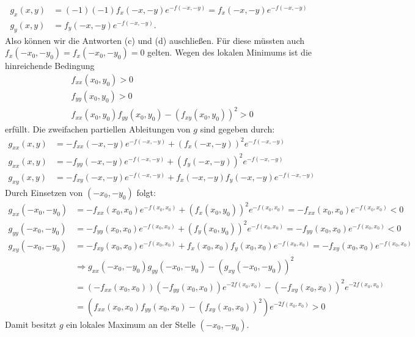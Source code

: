 \begin{align*}
	g_x(x,y) &= (-1) (-1) f_x(-x,-y) e^{-f(-x,-y)}
	=
	f_x(-x,-y) e^{-f(-x,-y)}\\
	g_y(x,y) &=
	f_y(-x,-y) e^{-f(-x,-y)}.
\end{align*}
Also können wir die Antworten (c) und (d) auschließen.
Für diese müssten auch $ f_x(-x_0,-y_0) = f_x(-x_0,-y_0) = 0 $ gelten. 
Wegen des lokalen Minimums ist die hinreichende Bedingung 
\begin{align*}
	&f_{xx}(x_0,y_0) >0\\
	&f_{yy}(x_0,y_0) > 0\\
	&f_{xx}(x_0,y_0)f_{yy}(x_0,y_0) - (f_{xy}(x_0,y_0))^2 >0
\end{align*}
erfüllt. Die zweifachen partiellen Ableitungen von $ g $ sind gegeben durch:
\begin{align*}
	g_{xx}(x,y) 
	&=
	-f_{xx}(-x,-y) e^{-f(-x,-y)}
	+ (f_x(-x,-y) )^2 e^{-f(-x,-y)}\\
	g_{xx}(x,y) 
	&=
	-f_{yy}(-x,-y) e^{-f(-x,-y)}
	+ (f_y(-x,-y) )^2 e^{-f(-x,-y)}\\
	g_{xy}(x,y)
	&=
	-f_{xy}(-x,-y) e^{-f(-x,-y)} + f_x(-x,-y) f_y(-x,-y) e^{-f(-x,-y)}
\end{align*}
Durch Einsetzen von $ (-x_0,-y_0) $ folgt:
\begin{align*}
	g_{xx}(-x_0,-y_0) 
	&=
	-f_{xx}(x_0,x_0) e^{-f(x_0,x_0)}
	+ (f_x(x_0,y_0) )^2 e^{-f(x_0,x_0)}
	= -f_{xx}(x_0,x_0) e^{-f(x_0,x_0)} < 0\\
	g_{yy}(-x_0,-y_0) 
	&=
	-f_{yy}(x_0,x_0) e^{-f(x_0,x_0)}
	+ (f_y(x_0,y_0) )^2 e^{-f(x_0,x_0)}
	= -f_{yy}(x_0,x_0) e^{-f(x_0,x_0)} < 0\\
	g_{xy}(-x_0,-y_0)
	&=
	-f_{xy}(x_0,x_0) e^{-f(x_0,x_0)} + f_x(x_0,x_0) f_y(x_0,x_0) e^{-f(x_0,x_0)}
	=
	-f_{xy}(x_0,x_0) e^{-f(x_0,x_0)}\\
	&\Rightarrow
	g_{xx}(-x_0,-y_0) g_{yy}(-x_0,-y_0) - (g_{xy}(-x_0,-y_0))^2\\
	&=
	(-f_{xx}(x_0,x_0)) (-f_{yy}(x_0,x_0)) e^{-2f(x_0,x_0)}
	-
	(-f_{xy}(x_0,x_0))^2 e^{-2f(x_0,x_0)}\\
	&=
	(f_{xx}(x_0,x_0)f_{yy}(x_0,x_0) - (f_{xy}(x_0,x_0))^2) e^{-2f(x_0,x_0)}
	> 0
\end{align*}
Damit besitzt $ g $ ein lokales Maximum an der Stelle $ (-x_0,-y_0) $.
\newpage
